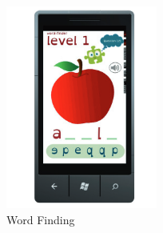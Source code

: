 \begin{figure}[!hbt]\centering
    \begin{subfigure}{0.25\textwidth}
        \includegraphics[width=\textwidth]{poten6}
        \caption{Word Finding}
    \end{subfigure}\hspace{0.05\textwidth}
\begin{subfigure}{0.25\textwidth}

\end{subfigure}
\end{figure}

